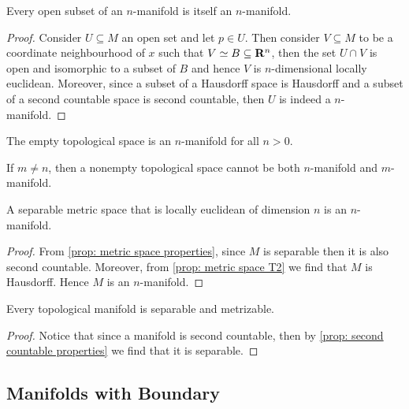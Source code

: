 \begin{proposition}
Every open subset of an \(n\)-manifold is itself an \(n\)-manifold.
\end{proposition}

\begin{proof}
Consider \(U \subseteq M\) an open set and let \(p \in U\). Then consider \(V
\subseteq M\) to be a coordinate neighbourhood of \(x\) such that \(V \simeq B
\subseteq \mathbf{R}^n\), then the set \(U \cap V\) is open and isomorphic
to a subset of \(B\) and hence \(V\) is \(n\)-dimensional locally euclidean.
Moreover, since a subset of a Hausdorff space is Hausdorff and a subset of a
second countable space is second countable, then \(U\) is indeed a
\(n\)-manifold.
\end{proof}

\begin{definition}
The empty topological space is an \(n\)-manifold for all \(n > 0\).
\end{definition}

\begin{theorem}\label{def: manifold dimension invariance}
If \(m \neq n\), then a nonempty topological space cannot be both
\(n\)-manifold and \(m\)-manifold.
\end{theorem}

\begin{proposition}
A separable metric space that is locally euclidean of dimension \(n\) is an
\(n\)-manifold.
\end{proposition}

\begin{proof}
From \cref{prop: metric space properties}, since \(M\) is separable then it is
also second countable. Moreover, from \cref{prop: metric space T2} we find
that \(M\) is Hausdorff. Hence \(M\) is an \(n\)-manifold.
\end{proof}

\begin{proposition}
Every topological manifold is separable and metrizable.
\end{proposition}

\begin{proof}
Notice that since a manifold is second countable, then by \cref{prop: second
countable properties} we find that it is separable.
\end{proof}

\subsection{Manifolds with Boundary}

